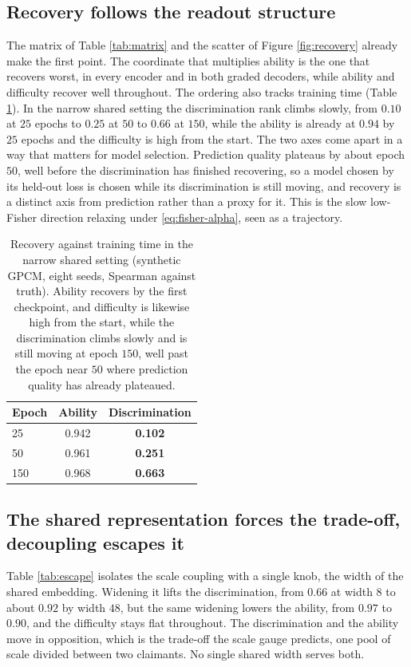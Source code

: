 \documentclass[sigconf,nonacm,screen]{acmart}
\begin{document}
\subsection{Recovery follows the readout structure}
The matrix of Table \ref{tab:matrix} and the scatter of Figure \ref{fig:recovery}
already make the first point. The coordinate that multiplies ability is the one that
recovers worst, in every encoder and in both graded decoders, while ability and
difficulty recover well throughout. The ordering also tracks training time (Table
\ref{tab:speeds}). In the narrow shared setting the discrimination rank climbs slowly,
from $0.10$ at $25$ epochs to $0.25$ at $50$ to $0.66$ at $150$, while the ability is
already at $0.94$ by $25$ epochs and the difficulty is high from the start. The two
axes come apart in a way that matters for model selection. Prediction quality plateaus
by about epoch $50$, well before the discrimination has finished recovering, so a
model chosen by its held-out loss is chosen while its discrimination is still moving,
and recovery is a distinct axis from prediction rather than a proxy for it. This is
the slow low-Fisher direction relaxing under \eqref{eq:fisher-alpha}, seen as a
trajectory.

\begin{table}[t]
\caption{Recovery against training time in the narrow shared setting (synthetic
GPCM, eight seeds, Spearman against truth). Ability recovers by the first
checkpoint, and difficulty is likewise high from the start, while the discrimination
climbs slowly and is still moving at epoch $150$, well past the epoch near $50$ where
prediction quality has already plateaued.}
\label{tab:speeds}
\small
\begin{tabular}{@{}lcc@{}}
\toprule
Epoch & Ability & \textbf{Discrimination} \\
\midrule
25  & 0.942 & \textbf{0.102} \\
50  & 0.961 & \textbf{0.251} \\
150 & 0.968 & \textbf{0.663} \\
\bottomrule
\end{tabular}
\end{table}

\subsection{The shared representation forces the trade-off, decoupling escapes it}
\label{sec:escape}
Table \ref{tab:escape} isolates the scale coupling with a single knob, the width of
the shared embedding. Widening it lifts the discrimination, from $0.66$ at width $8$
to about $0.92$ by width $48$, but the same widening lowers the ability, from $0.97$
to $0.90$, and the difficulty stays flat throughout. The discrimination and the
ability move in opposition, which is the trade-off the scale gauge predicts, one
pool of scale divided between two claimants. No single shared width serves both.
\end{document}
